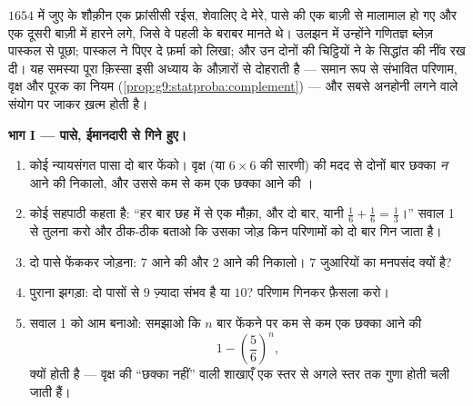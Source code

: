 \begin{problem}
\label{pb:g9:statproba:1}
$1654$ में जुए के शौक़ीन एक फ़्रांसीसी रईस, शेवालिए दे मेरे, पासे की
एक बाज़ी से मालामाल हो गए और एक दूसरी बाज़ी में हारने लगे, जिसे वे
पहली के बराबर मानते थे। उलझन में उन्होंने गणितज्ञ ब्लेज़ पास्कल से
पूछा; पास्कल ने पिएर दे फ़र्मा को लिखा; और उन दोनों की चिट्ठियों ने
 के सिद्धांत की नींव रख दी। यह समस्या पूरा क़िस्सा इसी
अध्याय के औज़ारों से दोहराती है --- समान रूप से संभावित परिणाम, वृक्ष
और पूरक का नियम (\cref{prop:g9:statproba:complement}) --- और सबसे
अनहोनी लगने वाले संयोग पर जाकर ख़त्म होती है।

\medskip
\noindent\textbf{भाग I --- पासे, ईमानदारी से गिने हुए।}
\begin{enumerate}
  \item कोई न्यायसंगत पासा दो बार फेंको। वृक्ष (या $6 \times 6$ की
        सारणी) की मदद से दोनों बार छक्का \emph{न} आने की 
        निकालो, और उससे कम से कम एक छक्का आने की ।
  \item कोई सहपाठी कहता है: ``हर बार छह में से एक मौक़ा, और दो बार,
        यानी $\frac16 + \frac16 = \frac13$।'' सवाल 1 से तुलना करो
        और ठीक-ठीक बताओ कि उसका जोड़ किन परिणामों को दो बार गिन
        जाता है।
  \item दो पासे फेंककर जोड़ना:  $7$ आने की और  $2$ आने की
         निकालो। $7$ जुआरियों का मनपसंद क्यों है?
  \item पुराना झगड़ा: दो पासों से  $9$ ज़्यादा संभव है या
         $10$? परिणाम गिनकर फ़ैसला करो।
  \item सवाल 1 को आम बनाओ: समझाओ कि $n$ बार फेंकने पर कम से कम एक
        छक्का आने की 
        \[
        1 - \left(\frac56\right)^{\!n} ,
        \]
        क्यों होती है --- वृक्ष की ``छक्का नहीं'' वाली शाखाएँ एक
        स्तर से अगले स्तर तक गुणा होती चली जाती हैं।
\end{enumerate}


\end{problem}
